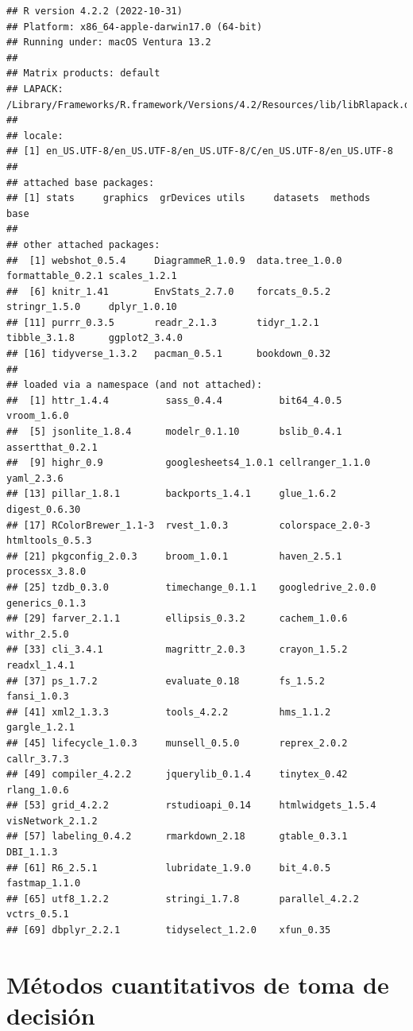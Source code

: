 \documentclass[
]{book}
\begin{document}
\begin{verbatim}
## R version 4.2.2 (2022-10-31)
## Platform: x86_64-apple-darwin17.0 (64-bit)
## Running under: macOS Ventura 13.2
## 
## Matrix products: default
## LAPACK: /Library/Frameworks/R.framework/Versions/4.2/Resources/lib/libRlapack.dylib
## 
## locale:
## [1] en_US.UTF-8/en_US.UTF-8/en_US.UTF-8/C/en_US.UTF-8/en_US.UTF-8
## 
## attached base packages:
## [1] stats     graphics  grDevices utils     datasets  methods   base     
## 
## other attached packages:
##  [1] webshot_0.5.4     DiagrammeR_1.0.9  data.tree_1.0.0   formattable_0.2.1 scales_1.2.1     
##  [6] knitr_1.41        EnvStats_2.7.0    forcats_0.5.2     stringr_1.5.0     dplyr_1.0.10     
## [11] purrr_0.3.5       readr_2.1.3       tidyr_1.2.1       tibble_3.1.8      ggplot2_3.4.0    
## [16] tidyverse_1.3.2   pacman_0.5.1      bookdown_0.32    
## 
## loaded via a namespace (and not attached):
##  [1] httr_1.4.4          sass_0.4.4          bit64_4.0.5         vroom_1.6.0        
##  [5] jsonlite_1.8.4      modelr_0.1.10       bslib_0.4.1         assertthat_0.2.1   
##  [9] highr_0.9           googlesheets4_1.0.1 cellranger_1.1.0    yaml_2.3.6         
## [13] pillar_1.8.1        backports_1.4.1     glue_1.6.2          digest_0.6.30      
## [17] RColorBrewer_1.1-3  rvest_1.0.3         colorspace_2.0-3    htmltools_0.5.3    
## [21] pkgconfig_2.0.3     broom_1.0.1         haven_2.5.1         processx_3.8.0     
## [25] tzdb_0.3.0          timechange_0.1.1    googledrive_2.0.0   generics_0.1.3     
## [29] farver_2.1.1        ellipsis_0.3.2      cachem_1.0.6        withr_2.5.0        
## [33] cli_3.4.1           magrittr_2.0.3      crayon_1.5.2        readxl_1.4.1       
## [37] ps_1.7.2            evaluate_0.18       fs_1.5.2            fansi_1.0.3        
## [41] xml2_1.3.3          tools_4.2.2         hms_1.1.2           gargle_1.2.1       
## [45] lifecycle_1.0.3     munsell_0.5.0       reprex_2.0.2        callr_3.7.3        
## [49] compiler_4.2.2      jquerylib_0.1.4     tinytex_0.42        rlang_1.0.6        
## [53] grid_4.2.2          rstudioapi_0.14     htmlwidgets_1.5.4   visNetwork_2.1.2   
## [57] labeling_0.4.2      rmarkdown_2.18      gtable_0.3.1        DBI_1.1.3          
## [61] R6_2.5.1            lubridate_1.9.0     bit_4.0.5           fastmap_1.1.0      
## [65] utf8_1.2.2          stringi_1.7.8       parallel_4.2.2      vctrs_0.5.1        
## [69] dbplyr_2.2.1        tidyselect_1.2.0    xfun_0.35
\end{verbatim}

\hypertarget{muxe9todos-cuantitativos-de-toma-de-decisiuxf3n}{%
\section{Métodos cuantitativos de toma de decisión}\label{muxe9todos-cuantitativos-de-toma-de-decisiuxf3n}}
\end{document}
